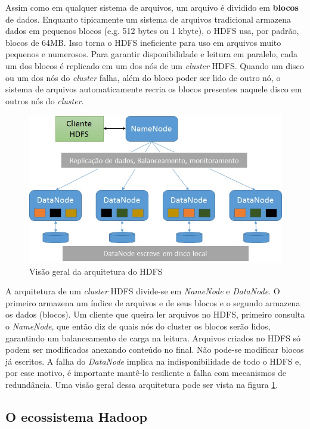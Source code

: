 Assim como em qualquer sistema de arquivos, um arquivo é dividido em \textbf{blocos} de dados. Enquanto 
tipicamente um sistema de arquivos tradicional armazena dados em pequenos blocos (e.g. 512 bytes ou 1 kbyte), 
o HDFS usa, por padrão, blocos de 64MB. Isso torna o HDFS ineficiente para uso em arquivos muito pequenos 
e numerosos. Para garantir disponibilidade e leitura em paralelo, cada um dos blocos é replicado em um dos 
nós de um \textit{cluster} HDFS. Quando um disco ou um dos nós do \textit{cluster} falha, além do bloco 
poder ser lido de outro nó, o sistema de arquivos automaticamente recria os blocos presentes naquele disco 
em outros nós do \textit{cluster}.

\begin{figure}[!htbp]
	\centering
	\includegraphics[width=\linewidth]{./Arquitetura_HDFS.jpg}
	\caption{Visão geral da arquitetura do HDFS}
	\label{fig:hdfs_arch}
\end{figure}

A arquitetura de um \textit{cluster} HDFS divide-se em \textit{NameNode} e \textit{DataNode}. O primeiro armazena um índice de arquivos e de seus blocos e o segundo armazena os dados (blocos). Um cliente que queira ler arquivos no HDFS, primeiro consulta o \textit{NameNode}, que então diz de quais nós do cluster os blocos serão lidos, garantindo um balanceamento de carga na leitura. Arquivos criados no HDFS só podem ser modificados anexando conteúdo no final. Não pode-se modificar blocos já escritos. A falha do \textit{DataNode} implica na indisponibilidade de todo o HDFS e, por esse motivo, é importante mantê-lo resiliente a falha com mecanismos de redundância. Uma visão geral dessa arquitetura pode ser vista na figura \ref{fig:hdfs_arch}.

\subsection{O ecossistema Hadoop}

